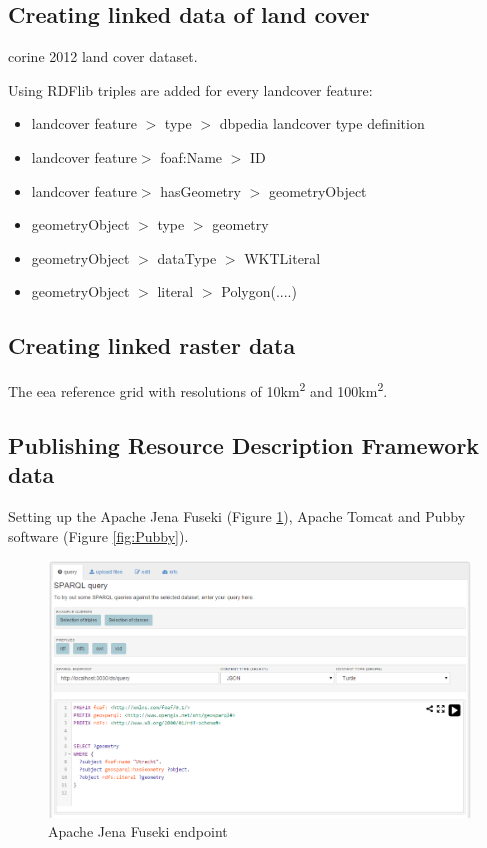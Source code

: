 \subsection{Creating linked data of land cover}
\ac{corine} 2012 land cover dataset. 

Using RDFlib triples are added for every landcover feature: 
\begin{itemize}
	\item landcover feature $>$ type $>$ dbpedia landcover type definition
	\item landcover feature$>$ foaf:Name $>$ ID
	\item landcover feature$>$ hasGeometry $>$ geometryObject
	\item geometryObject $>$ type $>$ geometry
	\item geometryObject $>$ dataType $>$ WKTLiteral
	\item geometryObject $>$ literal $>$ Polygon(....)
\end{itemize}

\subsection{Creating linked raster data}
The \ac{eea} reference grid with resolutions of 10km\textsuperscript{2} and 100km\textsuperscript{2}.

\subsection{Publishing Resource Description Framework data}
Setting up the Apache Jena Fuseki (Figure \ref{fig:Fuseki}), Apache Tomcat and Pubby software (Figure \ref{fig:Pubby}\textbf{}).

\begin{figure}
	\includegraphics[width=\linewidth]{figs/fuseki.PNG}
	\caption{Apache Jena Fuseki endpoint}
	\label{fig:Fuseki}
\end{figure}

